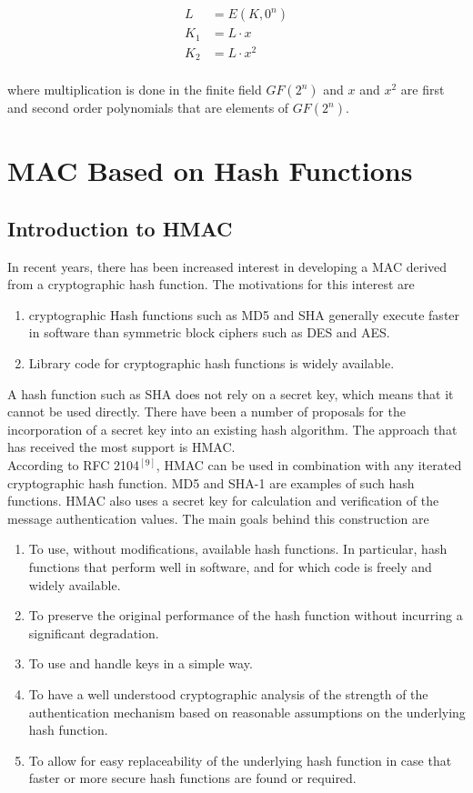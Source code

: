 \documentclass[12pt,a4paper,oneside]{report}
\begin{document}
\begin{align*}
    L &= E(K,0^n) \\
    K_1 &= L \cdot x \\
    K_2 &= L \cdot x^2 \\
\end{align*}

where multiplication is done in the finite field $GF(2^n)$ and $x$ and $x^2$ are first and
second order polynomials that are elements of $GF(2^n)$. 

\section{MAC Based on Hash Functions}

\subsection{Introduction to HMAC}

In recent years, there has been increased interest in developing a MAC derived from a cryptographic hash function. The motivations for this interest are
\begin{enumerate}[(1)]
    \item cryptographic Hash functions such as MD5 and SHA generally execute faster in software than symmetric block ciphers such as DES and AES.
    \item Library code for cryptographic hash functions is widely available.
\end{enumerate}

A hash function such as SHA does not rely on a secret key, which means that it cannot be used directly. There have been a number of proposals for the incorporation of a secret key into an existing hash algorithm. The approach that has received the most support is HMAC. \\

According to RFC 2104$^{[9]}$, HMAC can be used in combination with any iterated cryptographic hash
   function. MD5 and SHA-1 are examples of such hash functions. HMAC
   also uses a secret key for calculation and verification of the
   message authentication values. The main goals behind this
   construction are
   
\begin{enumerate}[(1)]
    \item To use, without modifications, available hash functions.
     In particular, hash functions that perform well in software,
     and for which code is freely and widely available.
   \item To preserve the original performance of the hash function without
     incurring a significant degradation.
   \item To use and handle keys in a simple way.
   \item To have a well understood cryptographic analysis of the strength of
     the authentication mechanism based on reasonable assumptions on the
     underlying hash function.
   \item To allow for easy replaceability of the underlying hash function in
     case that faster or more secure hash functions are found or
     required.
\end{enumerate}
\end{document}
